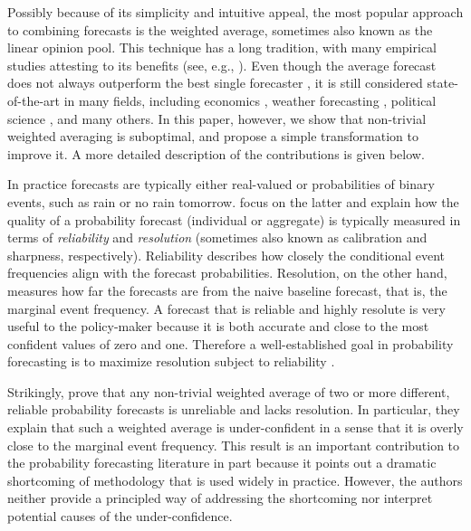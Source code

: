 \documentclass[12pt]{article}
\theoremstyle{definition}
\theoremstyle{definition}
\begin{document}
Possibly because of its simplicity and intuitive appeal, the most
popular approach to combining forecasts is the weighted average, sometimes also known as the linear opinion pool. 
This technique has a long tradition, with many empirical studies attesting to its benefits (see, e.g., \citealt{bates1969combination, clemen1989combining, armstrong2}). 
Even though the average forecast does not always outperform the best single forecaster \citep{hibon2005combine}, it is still considered state-of-the-art \citep{elliott2013handbook}
 in many fields, including economics \citep{blix2001good},  weather forecasting \citep{raftery2005using}, political science \citep{graefea2014combining}, and many others. In this paper, however, we show that non-trivial weighted averaging is suboptimal, and propose a simple transformation to improve it. A more detailed description of the contributions is given below.
%


In practice forecasts are typically either real-valued or probabilities of binary events, such as rain or no
rain tomorrow. \cite{Ranjan08} focus on the latter and
 explain how the quality of a probability forecast
(individual or aggregate) is typically measured in terms of
\textit{reliability} and \textit{resolution} (sometimes also known as calibration and
sharpness, respectively). Reliability describes how closely the
conditional event frequencies align with the forecast
probabilities. Resolution, on the other hand, measures how far the
forecasts are from the naive baseline forecast, that is, the marginal
event frequency. A forecast that is reliable and highly resolute is
very useful to the policy-maker because it is both accurate and close
to the most confident values of zero and one. Therefore a
well-established goal in probability forecasting is to maximize resolution subject to
reliability \citep{murphy1987general, gneiting2007probabilistic}.


Strikingly, \cite{Ranjan08} prove that any non-trivial weighted average
of two or more different, reliable probability forecasts is
unreliable and lacks resolution. In particular, they explain that such
a weighted average is  under-confident in a sense that it is overly
close to the marginal event frequency. This result is an important
contribution to the probability forecasting literature in part
because it points out a dramatic shortcoming of methodology that is
used widely in practice. However, the authors neither provide a
principled way of addressing the shortcoming nor interpret potential causes of the under-confidence. 
\end{document}
